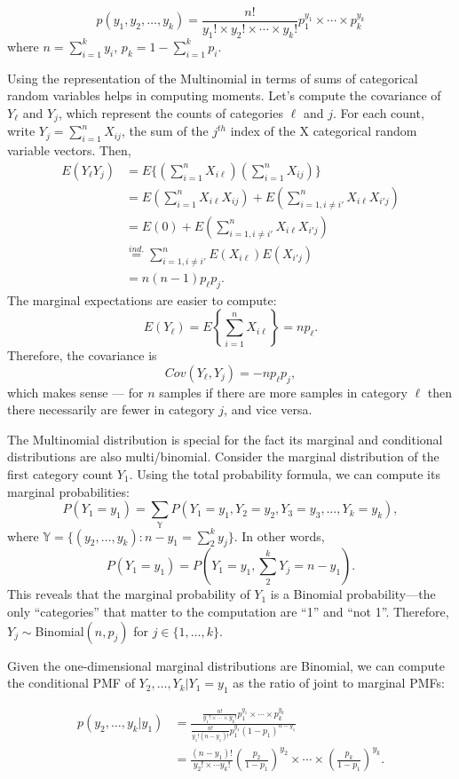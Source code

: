 \documentclass[
]{book}
\begin{document}
\[p(y_1, y_2, \ldots, y_{k}) = \frac{n!}{y_1!\times y_2!\times \cdots \times y_k!}p_1^{y_1}\times \cdots \times p_k^{y_k}\]
where \(n = \sum_{i=1}^k y_i\), \(p_k = 1 - \sum_{i=1}^k p_i\).

Using the representation of the Multinomial in terms of sums of categorical random variables helps in computing moments. Let's compute the covariance of \(Y_\ell\) and \(Y_j\), which represent the counts of categories \(\ell\) and \(j\). For each count, write \(Y_j = \sum_{i=1}^nX_{ij}\), the sum of the \(j^{th}\) index of the X categorical random variable vectors. Then,
\begin{align*}
E(Y_\ell Y_j) &= E\{(\sum_{i=1}^n X_{i\ell})(\sum_{i=1}^n X_{ij})\}\\
& = E(\sum_{i=1}^n X_{i\ell}X_{ij}) + E(\sum_{i=1,i\ne i'}^n X_{i\ell}X_{i'j})\\
& = E(0) + E(\sum_{i=1,i\ne i'}^n X_{i\ell}X_{i'j})\\
& \stackrel{ind.}{=}  \sum_{i=1,i\ne i'}^n E(X_{i\ell})E(X_{i'j})\\
& = n(n-1)p_\ell p_j.
\end{align*}
The marginal expectations are easier to compute:
\[E(Y_\ell) = E\left\{\sum_{i=1}^n X_{i\ell}\right\} = np_\ell.\]
Therefore, the covariance is
\[Cov(Y_\ell, Y_j) = -np_\ell p_j,\]
which makes sense --- for \(n\) samples if there are more samples in category \(\ell\) then there necessarily are fewer in category \(j\), and vice versa.

The Multinomial distribution is special for the fact its marginal and conditional distributions are also multi/binomial. Consider the marginal distribution of the first category count \(Y_1\). Using the total probability formula, we can compute its marginal probabilities:
\[P(Y_1 = y_1) = \sum_{\mathbb{Y}}P(Y_1 = y_1, Y_2 = y_2, Y_3 = y_3, \ldots,Y_k = y_k),\]
where \(\mathbb{Y} = \{(y_2, \ldots, y_k): n-y_1 =\sum_{2}^k y_j\}\). In other words,
\[P(Y_1 = y_1) = P(Y_1 = y_1, \sum_2^k Y_j = n - y_1).\]
This reveals that the marginal probability of \(Y_1\) is a Binomial probability---the only ``categories'' that matter to the computation are ``1'' and ``not 1''. Therefore, \(Y_j \sim\)Binomial\((n,p_j)\) for \(j \in \{1,\ldots,k\}\).

Given the one-dimensional marginal distributions are Binomial, we can compute the conditional PMF of \(Y_2,\ldots, Y_k|Y_1 = y_1\) as the ratio of joint to marginal PMFs:

\begin{align*}
p(y_2, \ldots, y_k|y_1) &= \frac{\frac{n!}{y_1!\times \cdots \times y_k!} p_1^{y_1}\times \cdots \times p_k^{y_k}}{ \frac{n!}{y_1! (n-y_1)!} p_1^{y_1}(1-p_1)^{n-y_1}}\\
& = \frac{(n-y_1)!}{y_2!\times \cdots y_k!}\left(\frac{p_2}{1-p_1}\right)^{y_2}\times \cdots \times \left(\frac{p_k}{1-p_1}\right)^{y_k}.
\end{align*}
\end{document}
